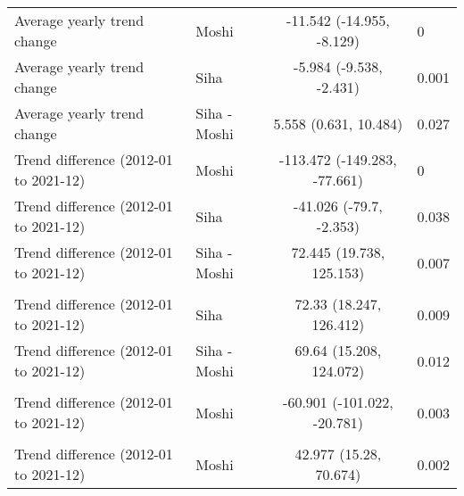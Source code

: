 \begin{longtable}{l|lcl}
\midrule\addlinespace[2.5pt]
Average yearly trend change & Moshi & -11.542 (-14.955, -8.129) & 0 \\ 
Average yearly trend change & Siha & -5.984 (-9.538, -2.431) & 0.001 \\ 
Average yearly trend change & Siha - Moshi & 5.558 (0.631, 10.484) & 0.027 \\ 
Trend difference (2012-01 to 2021-12) & Moshi & -113.472 (-149.283, -77.661) & 0 \\ 
Trend difference (2012-01 to 2021-12) & Siha & -41.026 (-79.7, -2.353) & 0.038 \\ 
Trend difference (2012-01 to 2021-12) & Siha - Moshi & 72.445 (19.738, 125.153) & 0.007 \\ 
\midrule\addlinespace[2.5pt]
\multicolumn{4}{l}{Neoplasms/Cancer} \\ 
\midrule\addlinespace[2.5pt]
Trend difference (2012-01 to 2021-12) & Siha & 72.33 (18.247, 126.412) & 0.009 \\ 
Trend difference (2012-01 to 2021-12) & Siha - Moshi & 69.64 (15.208, 124.072) & 0.012 \\ 
\midrule\addlinespace[2.5pt]
\multicolumn{4}{l}{Road Traffic Accidents} \\ 
\midrule\addlinespace[2.5pt]
Trend difference (2012-01 to 2021-12) & Moshi & -60.901 (-101.022, -20.781) & 0.003 \\ 
\midrule\addlinespace[2.5pt]
\multicolumn{4}{l}{Typhoid} \\ 
\midrule\addlinespace[2.5pt]
Trend difference (2012-01 to 2021-12) & Moshi & 42.977 (15.28, 70.674) & 0.002 \\ 
\bottomrule
\end{longtable}

